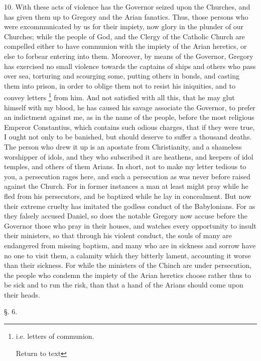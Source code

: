 10. With these acts of violence has the Governor
seized upon the Churches, and has given them up to Gregory and the
Arian fanatics. Thus, those persons who were excommunicated by us for
their impiety, now glory in the plunder of our Churches; while the
people of God, and the Clergy of the Catholic Church are compelled
either to have communion with the impiety of the Arian heretics, or
else to forbear entering into them. Moreover, by means of the
Governor, Gregory has exercised no small violence towards the captains
of ships and others who pass over sea, torturing and scourging some,
putting others in bonds, and casting them into prison, in order to
oblige them not to resist his iniquities, and to convey letters \footnote{i.e. letters of communion.

Return to text} from him. And not satisfied with all this, that he may glut
himself with my blood, he has caused his savage associate the
Governor, to prefer an indictment against me, as in the name of
the people, before the most religious Emperor Constantius, which
contains such odious charges, that if they were true, I ought not only
to be banished, but should deserve to suffer a thousand deaths. The
person who drew it up is an apostate from Christianity, and a
shameless worshipper of idols, and they who subscribed it are
heathens, and keepers of idol temples, and others of them Arians. In
short, not to make my letter tedious to you, a persecution rages here,
and such a persecution as was never before raised against the Church.
For in former instances a man at least might pray while he fled from
his persecutors, and be baptized while he lay in concealment. But now
their extreme cruelty has imitated the godless conduct of the
Babylonians. For as they falsely accused Daniel, so does the notable
Gregory now accuse before the Governor those who pray in their houses,
and watches every opportunity to insult their ministers, so that
through his violent conduct, the souls of many are endangered from
missing baptism, and many who are in sickness and sorrow have no one
to visit them, a calamity which they bitterly lament, accounting it
worse than their sickness. For while the ministers of the Chinch are
under persecution, the people who condemn the impiety of the Arian
heretics choose rather thus to be sick and to run the risk, than that
a hand of the Arians should come upon their heads.

§. 6.

